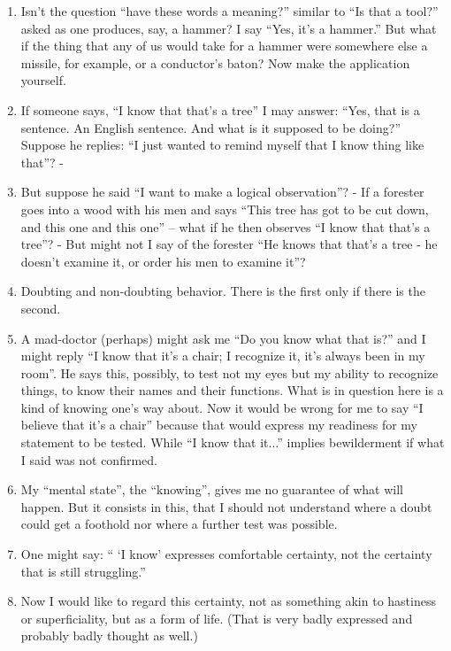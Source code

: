 \documentclass{book}
\begin{document}
\begin{enumerate}
\item
Isn't the question ``have these words a meaning?'' similar to ``Is that a
tool?'' asked as one produces, say, a hammer? I say ``Yes, it's a hammer.'' But
what if the thing that any of us would take for a hammer were somewhere else a
missile, for example, or a conductor's baton? Now make the application
yourself.

\item
If someone says, ``I know that that's a tree'' I may answer: ``Yes, that is a
sentence. An English sentence. And what is it supposed to be doing?'' Suppose
he replies: ``I just wanted to remind myself that I know thing like that''? -

\item
But suppose he said ``I want to make a logical observation''? - If a forester
goes into a wood with his men and says ``This tree has got to be cut down, and
this one and this one'' -- what if he then observes ``I know that that's a
tree''? - But might not I say of the forester ``He knows that that's a tree -
he doesn't examine it, or order his men to examine it''?

\item
Doubting and non-doubting behavior. There is the first only if there is the
second.

\item
A mad-doctor (perhaps) might ask me ``Do you know what that is?'' and I might
reply ``I know that it's a chair; I recognize it, it's always been in my
room''. He says this, possibly, to test not my eyes but my ability to recognize
things, to know their names and their functions. What is in question here is a
kind of knowing one's way about. Now it would be wrong for me to say ``I
believe that it's a chair'' because that would express my readiness for my
statement to be tested. While ``I know that it...'' implies bewilderment if
what I said was not confirmed.

\item
My ``mental state'', the ``knowing'', gives me no guarantee of what will
happen. But it consists in this, that I should not understand where a doubt
could get a foothold nor where a further test was possible.

\item
One might say: `` `I know' expresses comfortable certainty, not the certainty
that is still struggling.''

\item
Now I would like to regard this certainty, not as something akin to hastiness
or superficiality, but as a form of life. (That is very badly expressed and
probably badly thought as well.)


\end{enumerate}
\end{document}
